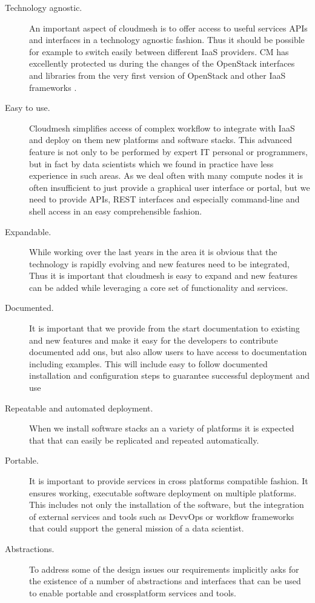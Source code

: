 \documentclass[9pt,twocolumn,twoside]{../../styles/osajnl}
\begin{document}
\begin{description}
\item [Technology agnostic.] An important aspect of cloudmesh is to
  offer access to useful services APIs and interfaces in a technology
  agnostic fashion. Thus it should be possible for example to switch
  easily between different IaaS providers. CM has excellently
  protected us during the changes of the OpenStack interfaces and
  libraries from the very first version of OpenStack and other IaaS
  frameworks \cite{paper-eucalyptus}.

\item[Easy to use.] Cloudmesh simplifies access of 
  complex workflow to integrate with IaaS and deploy on them new
  platforms and software stacks. This advanced feature is not only to
  be performed by expert IT personal or programmers, but in fact by
  data scientists which we found in practice have less experience in
  such areas. As we deal often with many compute nodes it is often
  insufficient to just provide a graphical user interface or portal, but
  we need to provide APIs, REST interfaces and especially command-line
  and shell access in an easy comprehensible fashion. 

\item[Expandable.] While working over the last years in the area it is
  obvious that the technology is rapidly evolving and new features
  need to be integrated, Thus it is important that cloudmesh is easy
  to expand and new features can be added while leveraging a core set
  of functionality and services.

\item[Documented.] It is important that we provide from the start
  documentation to existing and new features and make it easy for the
  developers to contribute documented add ons, but also allow users to
  have access to documentation including examples. This will include
  easy to follow documented installation and configuration steps to
  guarantee successful deployment and use

\item[Repeatable and automated deployment.] When we install software
  stacks an a variety of platforms it is expected that that can easily
  be replicated and repeated automatically.

\item[Portable.] It is important to provide services in cross
  platforms compatible fashion. It ensures working, executable
  software deployment on multiple platforms. This includes not only
  the installation of the software, but the integration of external
  services and tools such as DevvOps or workflow frameworks that could
  support the general mission of a data scientist.

\item[Abstractions.] To address some of the design issues our
  requirements implicitly asks for the existence of a number of
  abstractions and interfaces that can be used to enable portable and
  crossplatform services and tools.

\end{description}
\end{document}
